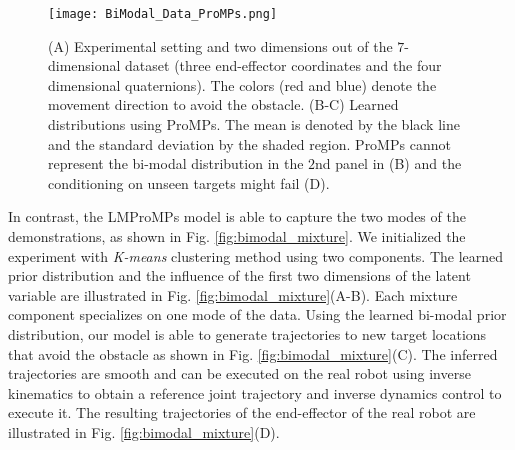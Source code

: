 \begin{figure}%
\begin{center}
\texttt{[image: BiModal\_Data\_ProMPs.png]}
\end{center}
\caption{(A) Experimental setting and two dimensions out of the $7$-dimensional dataset (three end-effector coordinates and the four dimensional quaternions). The colors (red and blue) denote the movement direction to avoid the obstacle.
(B-C) Learned distributions using ProMPs. The mean is denoted by the black line and the standard deviation by the shaded region. 
ProMPs cannot represent the bi-modal distribution in the $2$nd panel in (B) and 
the conditioning on unseen targets might fail (D). 
\label{fig:bimodal_data_promps}}
\end{figure}
  
In contrast, the LMProMPs model is able to capture the two modes of the
demonstrations, as shown in Fig. \ref{fig:bimodal_mixture}. We initialized the
experiment with \textit{K-means} clustering method using two components.  The
learned prior distribution and the influence of the first two dimensions of the
latent variable are illustrated in Fig. \ref{fig:bimodal_mixture}(A-B).
Each mixture component specializes on one mode of the data.  Using the learned
bi-modal prior distribution, our model is able to generate trajectories to new 
target locations that avoid the obstacle as shown in Fig.
\ref{fig:bimodal_mixture}(C).  
The inferred trajectories are smooth and can be
executed on the real robot using inverse kinematics to obtain a reference joint
trajectory and inverse dynamics control to execute it.  The resulting
trajectories of the end-effector of the real robot are illustrated in Fig.
\ref{fig:bimodal_mixture}(D). 



